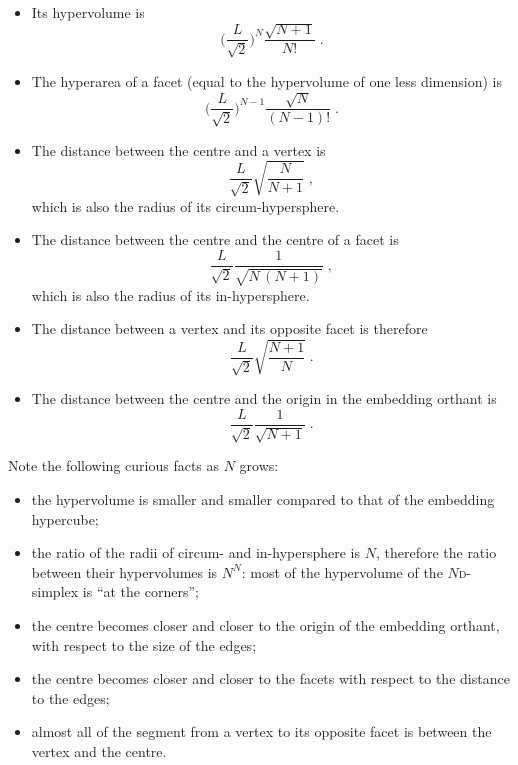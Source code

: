 \documentclass[\ifafour a4paper,12pt,\else a5paper,10pt,\fi%
onecolumn,oneside,article,%
british%
]{memoir}
\theoremstyle{remark}
\theoremstyle{innote}
\renewcommand*{\|}[1][]{\nonscript\,#1\vert\nonscript\;\mathopen{}}
\newcommand*{\dd}{\textsc{d}}
\newcommand*{\yL}{L}
\begin{document}
\begin{itemize}[wide]
\item Its hypervolume is
  \begin{equation}
    \label{eq:volume}
    \Biggl(\frac{\yL}{\sqrt{2}}\Biggr)^{N}\frac{\sqrt{N+1}}{N!} \;.
  \end{equation}
\item The hyperarea of a facet (equal to the hypervolume of one less
  dimension) is
  \begin{equation}
    \label{eq:area_facet}
    \Biggl(\frac{\yL}{\sqrt{2}}\Biggr)^{N-1}\frac{\sqrt{N}}{(N-1)!} \;.
  \end{equation}
\item The distance between the centre and a vertex is
  \begin{equation}
    \label{eq:centre_vertex}
    \frac{\yL}{\sqrt{2}} \sqrt{\frac{N}{N+1}} \;,
    \end{equation}
    which is also the radius of its circum-hypersphere.
\item The distance between the centre and the centre of a facet is
  \begin{equation}
    \label{eq:centre_facet}
    \frac{\yL}{\sqrt{2}}\frac{1}{\sqrt{N\,(N+1)}} \;,
  \end{equation}
  which is also the radius of its in-hypersphere.
\item The distance between a vertex and its opposite facet is therefore
  \begin{equation}
    \label{eq:vertex_facet}
    \frac{\yL}{\sqrt{2}}\sqrt{\frac{N+1}{N}} \;.
  \end{equation}
\item The distance between the centre and the origin in the embedding
  orthant is
  \begin{equation}
    \label{eq:centre_origin}
    \frac{\yL}{\sqrt{2}} \frac{1}{\sqrt{N+1}}\;.
  \end{equation}
  \mbox{}
\end{itemize}

Note the following curious facts as $N$ grows:
\begin{itemize}[wide]
\item the hypervolume is smaller and smaller compared to that of the
  embedding hypercube;
\item the ratio of the radii of circum- and in-hypersphere is $N$,
  therefore the ratio between their hypervolumes is $N^{N}$: most of the
  hypervolume of the $N$\dd-simplex is \enquote{at the corners};
\item the centre becomes closer and closer to the origin of the embedding
  orthant, with respect to the size of the edges;
\item the centre becomes closer and closer to the facets with respect to
  the distance to the edges;
\item almost all of the segment from a vertex to its opposite facet is
  between the vertex and the centre.
\end{itemize}
\end{document}
